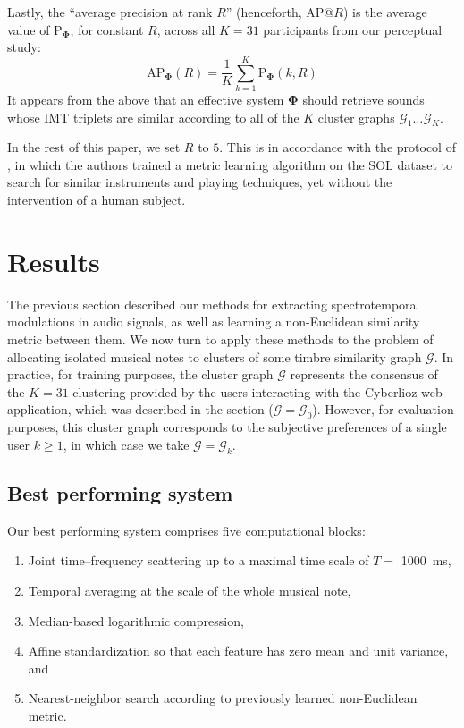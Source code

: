 \documentclass{bmcart}
\newcommand{\lnameref}[1]{%
\bgroup
\let\nmu\MakeLowercase
\nameref{#1}\egroup}
\newcommand{\nmu}{}
\begin{document}
Lastly, the ``average precision at rank $R$'' (henceforth, AP@$R$) is the average value of $\mathrm{P}_{\mathbf{\Phi}}$, for constant $R$, across all $K=31$ participants from our perceptual study:
\begin{equation}
\mathrm{AP}_{\mathbf{\Phi}}(R) =
\dfrac{1}{K}
\sum_{k=1}^{K}
\mathrm{P}_{\mathbf{\Phi}}(k, R)
\end{equation}
It appears from the above that an effective system $\mathbf{\Phi}$ should retrieve sounds whose IMT triplets are similar according to all of the $K$ cluster graphs $\mathcal{G}_1 \ldots \mathcal{G}_K$.

In the rest of this paper, we set $R$ to $5$.
This is in accordance with the protocol of \cite{lostanlen2018extended}, in which the authors trained a metric learning algorithm on the SOL dataset to search for similar instruments and playing techniques, yet without the intervention of a human subject.



\section*{\nmu Results}
\label{sec:results}

The previous section described our methods for extracting spectrotemporal modulations in audio signals, as well as learning a non-Euclidean similarity metric between them.
We now turn to apply these methods to the problem of allocating isolated musical notes to clusters of some timbre similarity graph $\mathcal{G}$.
In practice, for training purposes, the cluster graph $\mathcal{G}$ represents the consensus of the $K=31$ clustering provided by the users interacting with the Cyberlioz web application, which was described in the \lnameref{sec:data-collection} section ($\mathcal{G}=\mathcal{G}_0$).
However, for evaluation purposes, this cluster graph corresponds to the subjective preferences of a single user $k\geq 1$, in which case we take $\mathcal{G}=\mathcal{G}_k$.


\subsection*{Best performing system}
Our best performing system comprises five computational blocks:

\begin{enumerate}
\item Joint time--frequency scattering up to a maximal time scale of $T=$ \SI{1000}{\milli\second},
\item Temporal averaging at the scale of the whole musical note,
\item Median-based logarithmic compression,
\item Affine standardization so that each feature has zero mean and unit variance, and
\item Nearest-neighbor search according to previously learned non-Euclidean metric.
\end{enumerate}
\end{document}
